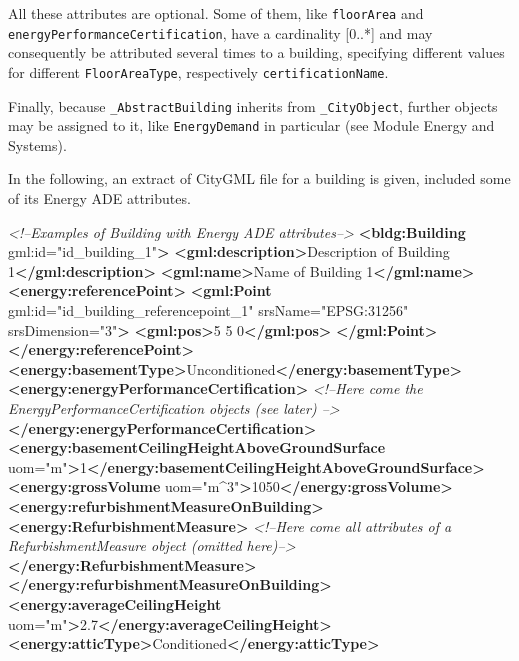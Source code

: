 \documentclass[a4paper,12pt]{article}
\newenvironment{Shaded}{}{}
\newcommand{\KeywordTok}[1]{\textcolor[rgb]{0.00,0.44,0.13}{\textbf{{#1}}}}
\newcommand{\StringTok}[1]{\textcolor[rgb]{0.25,0.44,0.63}{{#1}}}
\newcommand{\CommentTok}[1]{\textcolor[rgb]{0.38,0.63,0.69}{\textit{{#1}}}}
\newcommand{\OtherTok}[1]{\textcolor[rgb]{0.00,0.44,0.13}{{#1}}}
\newcommand{\NormalTok}[1]{{#1}}
\begin{document}
All these attributes are optional. Some of them, like \texttt{floorArea}
and\\
\texttt{energyPerformanceCertification}, have a cardinality {[}0..*{]}
and may consequently be attributed several times to a building,
specifying different values for different \texttt{FloorAreaType},
respectively \texttt{certificationName}.

Finally, because \texttt{\_AbstractBuilding} inherits from
\texttt{\_CityObject}, further objects may be assigned to it, like
\texttt{EnergyDemand} in particular (see Module Energy and Systems).

In the following, an extract of CityGML file for a building is given,
included some of its Energy ADE attributes.

\begin{Shaded}
\begin{Highlighting}[]
\CommentTok{<!--Examples of Building with Energy ADE attributes-->}
\KeywordTok{<bldg:Building}\OtherTok{ gml:id=}\StringTok{"id_building_1"}\KeywordTok{>}
    \KeywordTok{<gml:description>}\NormalTok{Description of Building 1}\KeywordTok{</gml:description>}
    \KeywordTok{<gml:name>}\NormalTok{Name of Building 1}\KeywordTok{</gml:name>}
    \KeywordTok{<energy:referencePoint>}
        \KeywordTok{<gml:Point}\OtherTok{ gml:id=}\StringTok{"id_building_referencepoint_1"}\OtherTok{ srsName=}\StringTok{"EPSG:31256"}\OtherTok{ srsDimension=}\StringTok{"3"}\KeywordTok{>}
            \KeywordTok{<gml:pos>}\NormalTok{5 5 0}\KeywordTok{</gml:pos>}
        \KeywordTok{</gml:Point>}
    \KeywordTok{</energy:referencePoint>}
    \KeywordTok{<energy:basementType>}\NormalTok{Unconditioned}\KeywordTok{</energy:basementType>}
    \KeywordTok{<energy:energyPerformanceCertification>}
        \CommentTok{<!--Here come the EnergyPerformanceCertification objects (see later) -->}
    \KeywordTok{</energy:energyPerformanceCertification>}
    \KeywordTok{<energy:basementCeilingHeightAboveGroundSurface}\OtherTok{ uom=}\StringTok{"m"}\KeywordTok{>}\NormalTok{1}\KeywordTok{</energy:basementCeilingHeightAboveGroundSurface>}
    \KeywordTok{<energy:grossVolume}\OtherTok{ uom=}\StringTok{"m^3"}\KeywordTok{>}\NormalTok{1050}\KeywordTok{</energy:grossVolume>}
    \KeywordTok{<energy:refurbishmentMeasureOnBuilding>}
        \KeywordTok{<energy:RefurbishmentMeasure>}
            \CommentTok{<!--Here come all attributes of a RefurbishmentMeasure object (omitted here)-->}
        \KeywordTok{</energy:RefurbishmentMeasure>}
    \KeywordTok{</energy:refurbishmentMeasureOnBuilding>}
    \KeywordTok{<energy:averageCeilingHeight}\OtherTok{ uom=}\StringTok{"m"}\KeywordTok{>}\NormalTok{2.7}\KeywordTok{</energy:averageCeilingHeight>}
    \KeywordTok{<energy:atticType>}\NormalTok{Conditioned}\KeywordTok{</energy:atticType>}


\end{Highlighting}
\end{Shaded}
\end{document}
